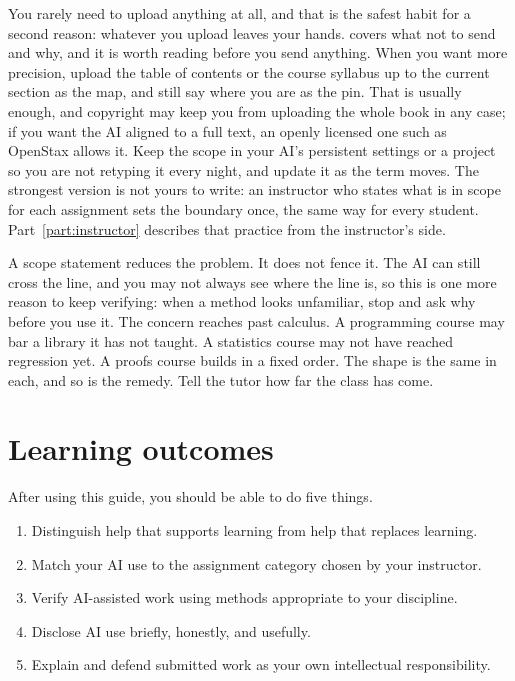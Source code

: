 \documentclass{SIAMbook2023}
\begin{document}
You rarely need to upload anything at all, and that is the safest habit for a second reason: whatever you upload leaves your hands.  covers what not to send and why, and it is worth reading before you send anything. When you want more precision, upload the table of contents or the course syllabus up to the current section as the map, and still say where you are as the pin. That is usually enough, and copyright may keep you from uploading the whole book in any case; if you want the AI aligned to a full text, an openly licensed one such as OpenStax allows it. Keep the scope in your AI's persistent settings or a project so you are not retyping it every night, and update it as the term moves. The strongest version is not yours to write: an instructor who states what is in scope for each assignment sets the boundary once, the same way for every student. Part~\ref{part:instructor} describes that practice from the instructor's side.

A scope statement reduces the problem. It does not fence it. The AI can still cross the line, and you may not always see where the line is, so this is one more reason to keep verifying: when a method looks unfamiliar, stop and ask why before you use it. The concern reaches past calculus. A programming course may bar a library it has not taught. A statistics course may not have reached regression yet. A proofs course builds in a fixed order. The shape is the same in each, and so is the remedy. Tell the tutor how far the class has come.

\section{Learning outcomes}
\label{sec:learning-outcomes}%

After using this guide, you should be able to do five things.

\begin{enumerate}
  \item Distinguish help that supports learning from help that replaces learning.
  \item Match your AI use to the assignment category chosen by your instructor.
  \item Verify AI-assisted work using methods appropriate to your discipline.
  \item Disclose AI use briefly, honestly, and usefully.
  \item Explain and defend submitted work as your own intellectual responsibility.
\end{enumerate}
\end{document}
